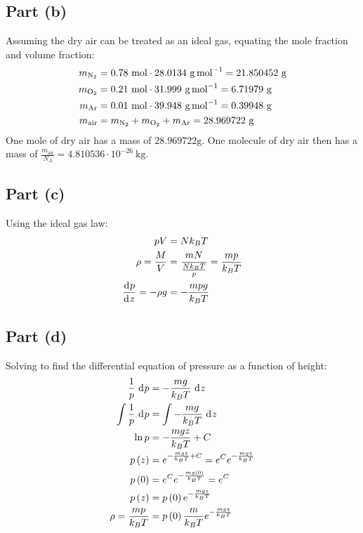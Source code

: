 \documentclass{article}
\begin{document}
\subsection*{Part (b)}
Assuming the dry air can be treated as an ideal gas, equating the mole fraction and volume fraction:
\begin{equation}
    \begin{split}
        m_{\ce{N2}} & = 0.78~\unit{\mole} \cdot 28.0134~\unit{\gram\per\mole} = 21.850452~\unit{\gram} \\
        m_{\ce{O2}} & = 0.21~\unit{\mole} \cdot 31.999~\unit{\gram\per\mole} = 6.71979~\unit{\gram} \\
        m_{\ce{Ar}} & = 0.01~\unit{\mole}\cdot 39.948~\unit{\gram\per\mole} = 0.39948~\unit{\gram} \\
        m_{\text{air}} & = m_{\ce{N2}} + m_{\ce{O2}} + m_{\ce{Ar}} = 28.969722~\unit{\gram}
    \end{split}
\end{equation}
One mole of dry air has a mass of $28.969722 \unit{\gram}$. One molecule of dry air then has a mass of $\frac{m_{\text{air}}}{N_A} = 4.810536 \cdot 10^{-26}~\unit{\kilo\gram}$.
\subsection*{Part (c)}
Using the ideal gas law:
\begin{equation}
    \begin{split}
        pV & = Nk_B T \\
        \rho = \frac{M}{V} & = \frac{mN}{\frac{Nk_B T}{p}} = \frac{mp}{k_B T} \\
        \deriv{p}{z} = -\rho g & = -\frac{mpg}{k_B T}
    \end{split}
\end{equation}
\subsection*{Part (d)}
Solving to find the differential equation of pressure as a function of height:
\begin{equation}
    \begin{split}
        \frac{1}{p} \, \diff{p} & = -\frac{mg}{k_BT} \, \diff{z} \\
        \int \frac{1}{p} \, \diff{p} & = \int -\frac{mg}{k_B T} \, \diff{z} \\
        \ln{p} & = -\frac{mgz}{k_B T} + C \\
        p\left(z\right) & = e^{-\frac{mgz}{k_B T} + C} = e^C e^{-\frac{mgz}{k_B T}} \\
        p\left(0\right) & = e^C e^{-\frac{mg\left(0\right)}{k_B T}} = e^C \\
        p\left(z\right) & = p\left(0\right)e^{-\frac{mgz}{k_B T}} \\
        \rho = \frac{mp}{k_B T} & = p\left(0\right)\frac{m}{k_B T}e^{-\frac{mgz}{k_B T}}
    \end{split}
\end{equation}
\end{document}
